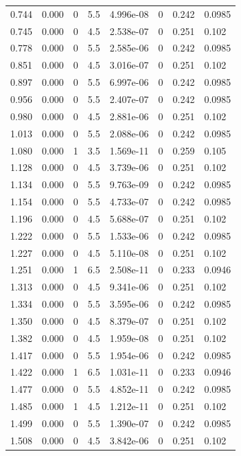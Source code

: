 \documentclass[preview]{standalone}
\begin{document}
{{\begin{tabular}{L{1.2cm}C{1.2cm} C{0.3cm}C{0.5cm} C{1.4cm}C{1.4cm} C{1.4cm}C{1.4cm}}
  0.744  &  0.000  & 0     & 5.5 &  4.996e-08  & 0  & 0.242 &  0.0985   \\ 
  0.745  &  0.000  & 0     & 4.5 &  2.538e-07  & 0  & 0.251 &  0.102   \\ 
  0.778  &  0.000  & 0     & 5.5 &  2.585e-06  & 0  & 0.242 &  0.0985   \\ 
  0.851  &  0.000  & 0     & 4.5 &  3.016e-07  & 0  & 0.251 &  0.102   \\ 
  0.897  &  0.000  & 0     & 5.5 &  6.997e-06  & 0  & 0.242 &  0.0985   \\ 
  0.956  &  0.000  & 0     & 5.5 &  2.407e-07  & 0  & 0.242 &  0.0985   \\ 
  0.980  &  0.000  & 0     & 4.5 &  2.881e-06  & 0  & 0.251 &  0.102   \\ 
  1.013  &  0.000  & 0     & 5.5 &  2.088e-06  & 0  & 0.242 &  0.0985   \\ 
  1.080  &  0.000  & 1     & 3.5 &  1.569e-11  & 0  & 0.259 &  0.105   \\ 
  1.128  &  0.000  & 0     & 4.5 &  3.739e-06  & 0  & 0.251 &  0.102   \\ 
  1.134  &  0.000  & 0     & 5.5 &  9.763e-09  & 0  & 0.242 &  0.0985   \\ 
  1.154  &  0.000  & 0     & 5.5 &  4.733e-07  & 0  & 0.242 &  0.0985   \\ 
  1.196  &  0.000  & 0     & 4.5 &  5.688e-07  & 0  & 0.251 &  0.102   \\ 
  1.222  &  0.000  & 0     & 5.5 &  1.533e-06  & 0  & 0.242 &  0.0985   \\ 
  1.227  &  0.000  & 0     & 4.5 &  5.110e-08  & 0  & 0.251 &  0.102   \\ 
  1.251  &  0.000  & 1     & 6.5 &  2.508e-11  & 0  & 0.233 &  0.0946   \\ 
  1.313  &  0.000  & 0     & 4.5 &  9.341e-06  & 0  & 0.251 &  0.102   \\ 
  1.334  &  0.000  & 0     & 5.5 &  3.595e-06  & 0  & 0.242 &  0.0985   \\ 
  1.350  &  0.000  & 0     & 4.5 &  8.379e-07  & 0  & 0.251 &  0.102   \\ 
  1.382  &  0.000  & 0     & 4.5 &  1.959e-08  & 0  & 0.251 &  0.102   \\ 
  1.417  &  0.000  & 0     & 5.5 &  1.954e-06  & 0  & 0.242 &  0.0985   \\ 
  1.422  &  0.000  & 1     & 6.5 &  1.031e-11  & 0  & 0.233 &  0.0946   \\ 
  1.477  &  0.000  & 0     & 5.5 &  4.852e-11  & 0  & 0.242 &  0.0985   \\ 
  1.485  &  0.000  & 1     & 4.5 &  1.212e-11  & 0  & 0.251 &  0.102   \\ 
  1.499  &  0.000  & 0     & 5.5 &  1.390e-07  & 0  & 0.242 &  0.0985   \\ 
  1.508  &  0.000  & 0     & 4.5 &  3.842e-06  & 0  & 0.251 &  0.102   \\ 
\hline 
\end{tabular} 

}}
\end{document}
